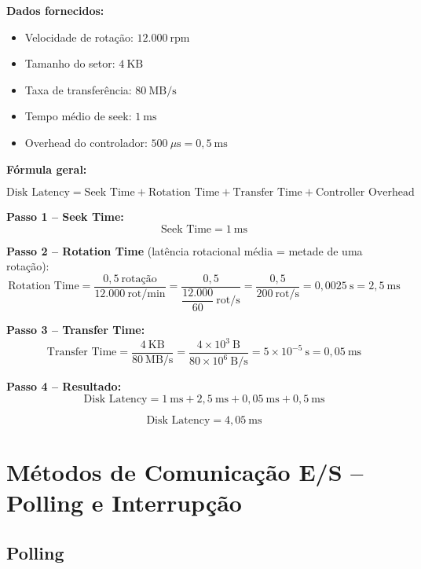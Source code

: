 \documentclass[12pt, a4paper]{article}
\begin{document}
\textbf{Dados fornecidos:}
\begin{itemize}[noitemsep]
  \item Velocidade de rotação: $12.000\ \mathrm{rpm}$
  \item Tamanho do setor: $4\ \mathrm{KB}$
  \item Taxa de transferência: $80\ \mathrm{MB/s}$
  \item Tempo médio de seek: $1\ \mathrm{ms}$
  \item Overhead do controlador: $500\ \mu\mathrm{s} = 0{,}5\ \mathrm{ms}$
\end{itemize}

\textbf{Fórmula geral:}

\[
  \text{Disk Latency} = \text{Seek Time} + \text{Rotation Time}
                      + \text{Transfer Time} + \text{Controller Overhead}
\]

\vspace{6pt}
\textbf{Passo 1 -- Seek Time:}
\[
  \text{Seek Time} = 1\ \mathrm{ms}
\]

\textbf{Passo 2 -- Rotation Time} (latência rotacional média = metade de uma rotação):
\[
  \text{Rotation Time}
    = \frac{0{,}5\ \text{rotação}}{12.000\ \text{rot/min}}
    = \frac{0{,}5}{\dfrac{12.000}{60}\ \text{rot/s}}
    = \frac{0{,}5}{200\ \text{rot/s}}
    = 0{,}0025\ \mathrm{s}
    = 2{,}5\ \mathrm{ms}
\]

\textbf{Passo 3 -- Transfer Time:}
\[
  \text{Transfer Time}
    = \frac{4\ \mathrm{KB}}{80\ \mathrm{MB/s}}
    = \frac{4 \times 10^{3}\ \mathrm{B}}{80 \times 10^{6}\ \mathrm{B/s}}
    = 5 \times 10^{-5}\ \mathrm{s}
    = 0{,}05\ \mathrm{ms}
\]

\textbf{Passo 4 -- Resultado:}
\[
  \text{Disk Latency}
    = 1\ \mathrm{ms} + 2{,}5\ \mathrm{ms} + 0{,}05\ \mathrm{ms} + 0{,}5\ \mathrm{ms}
\]

\begin{caixaazul}
  \[
    \boxed{\text{Disk Latency} = 4{,}05\ \mathrm{ms}}
  \]
\end{caixaazul}

\section{Métodos de Comunicação E/S -- Polling e Interrupção}

\subsection{Polling}
\end{document}
